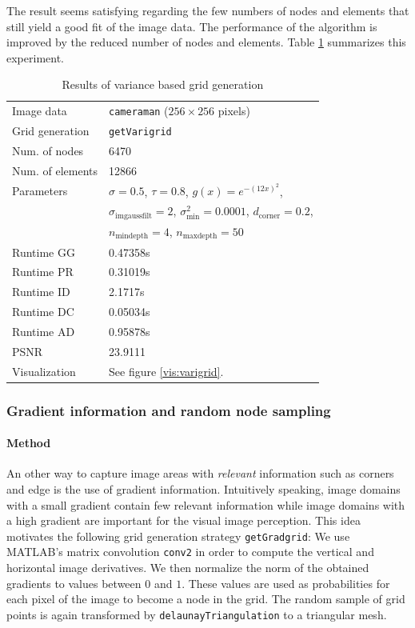\documentclass{report}
\begin{document}
The result seems satisfying regarding the few numbers of nodes and elements that still yield a good fit of the image data. The performance of the algorithm is improved by the reduced number of nodes and elements. Table \ref{res:varigrid} summarizes this experiment.

\begin{table}[h]
	\centering
	\begin{tabular}{|ll}
		Image data & \texttt{cameraman} ($256 \times 256$ pixels)\\
		Grid generation & \texttt{getVarigrid} \\
		Num. of nodes & 6470 \\
		Num. of elements & 12866 \\
		Parameters & $\sigma=0.5$, $\tau=0.8$, $g(x) = e^{-(12 x)^2}$, \\
		& $\sigma_\text{imgaussfilt}=2$, $\sigma^2_\text{min}=0.0001$, $d_\text{corner}=0.2$, \\
		& $n_\text{mindepth}=4$, $n_\text{maxdepth}=50$ \\
		Runtime GG & 0.47358s \\
		Runtime PR & 0.31019s \\
		Runtime ID & 2.1717s \\
		Runtime DC & 0.05034s \\
		Runtime AD & 0.95878s \\
		PSNR & 23.9111 \\
		Visualization & See figure \ref{vis:varigrid}. \\
	\end{tabular}
	\caption{Results of variance based grid generation}
	\label{res:varigrid}
\end{table}

\subsubsection{Gradient information and random node sampling}

\paragraph{Method}

An other way to capture image areas with \emph{relevant} information such as corners and edge is the use of gradient information. Intuitively speaking, image domains with a small gradient contain few relevant information while image domains with a high gradient are important for the visual image perception. This idea motivates the following grid generation strategy \texttt{getGradgrid}: We use MATLAB's matrix convolution \texttt{conv2} in order to compute the vertical and horizontal image derivatives. We then normalize the norm of the obtained gradients to values between $0$ and $1$. These values are used as probabilities for each pixel of the image to become a node in the grid. The random sample of grid points is again transformed by \texttt{delaunayTriangulation} to a triangular mesh.
\end{document}
